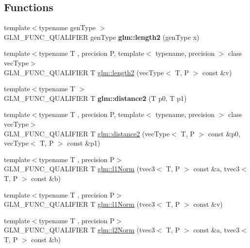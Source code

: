 \subsection*{Functions}
\begin{DoxyCompactItemize}
\item 
\mbox{\label{norm_8inl_a115f7e8a1d545b9e97b05d4be5ad491d}} 
{\footnotesize template$<$typename gen\+Type $>$ }\\G\+L\+M\+\_\+\+F\+U\+N\+C\+\_\+\+Q\+U\+A\+L\+I\+F\+I\+ER gen\+Type {\bfseries glm\+::length2} (gen\+Type x)
\item 
{\footnotesize template$<$typename T , precision P, template$<$ typename, precision $>$ class vec\+Type$>$ }\\G\+L\+M\+\_\+\+F\+U\+N\+C\+\_\+\+Q\+U\+A\+L\+I\+F\+I\+ER T \hyperlink{group__gtx__norm_ga6d326d62fd9b7f4f0a1b79e56492a7e4}{glm\+::length2} (vec\+Type$<$ T, P $>$ const \&v)
\item 
\mbox{\label{norm_8inl_a109e6f3d69b13cc1ce23a83103601ab0}} 
{\footnotesize template$<$typename T $>$ }\\G\+L\+M\+\_\+\+F\+U\+N\+C\+\_\+\+Q\+U\+A\+L\+I\+F\+I\+ER T {\bfseries glm\+::distance2} (T p0, T p1)
\item 
{\footnotesize template$<$typename T , precision P, template$<$ typename, precision $>$ class vec\+Type$>$ }\\G\+L\+M\+\_\+\+F\+U\+N\+C\+\_\+\+Q\+U\+A\+L\+I\+F\+I\+ER T \hyperlink{group__gtx__norm_ga647d2602008801d6ed78f9708eb439cc}{glm\+::distance2} (vec\+Type$<$ T, P $>$ const \&p0, vec\+Type$<$ T, P $>$ const \&p1)
\item 
{\footnotesize template$<$typename T , precision P$>$ }\\G\+L\+M\+\_\+\+F\+U\+N\+C\+\_\+\+Q\+U\+A\+L\+I\+F\+I\+ER T \hyperlink{group__gtx__norm_gaebe5a39b06e262e615622129f37da4f4}{glm\+::l1\+Norm} (tvec3$<$ T, P $>$ const \&a, tvec3$<$ T, P $>$ const \&b)
\item 
{\footnotesize template$<$typename T , precision P$>$ }\\G\+L\+M\+\_\+\+F\+U\+N\+C\+\_\+\+Q\+U\+A\+L\+I\+F\+I\+ER T \hyperlink{group__gtx__norm_ga6d5964f09cdb43803496a5ee3ced71cb}{glm\+::l1\+Norm} (tvec3$<$ T, P $>$ const \&v)
\item 
{\footnotesize template$<$typename T , precision P$>$ }\\G\+L\+M\+\_\+\+F\+U\+N\+C\+\_\+\+Q\+U\+A\+L\+I\+F\+I\+ER T \hyperlink{group__gtx__norm_gafa6fbbc99cd44d81bf030e74eaf7ad64}{glm\+::l2\+Norm} (tvec3$<$ T, P $>$ const \&a, tvec3$<$ T, P $>$ const \&b)

\end{DoxyCompactItemize}
